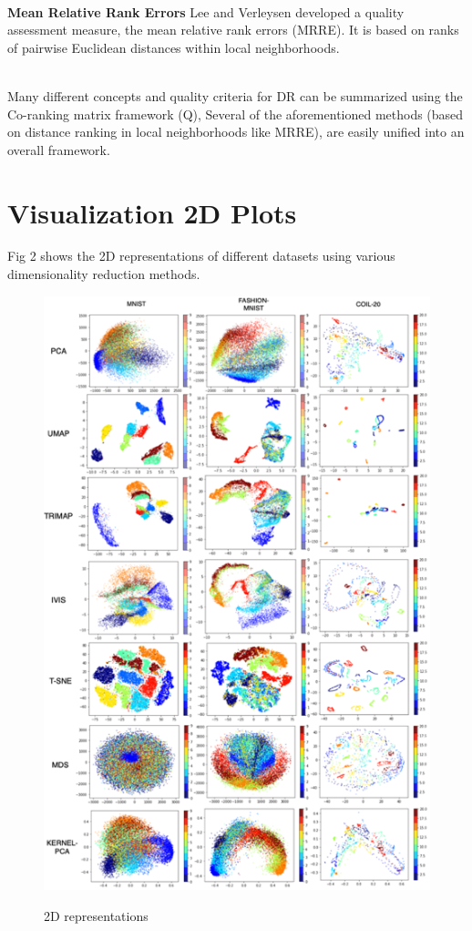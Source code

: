 \documentclass[letterpaper, 10 pt, conference]{ieeeconf}  %
\begin{document}
\\\textbf{Mean Relative Rank Errors} Lee and Verleysen developed a quality assessment measure, the mean relative rank errors (MRRE). It is based on ranks of pairwise Euclidean distances within local neighborhoods.
\vspace{2mm}

\\Many different concepts and quality criteria for DR can be summarized using the Co-ranking matrix framework (Q), Several of the aforementioned methods (based on distance ranking in local neighborhoods like MRRE), are easily unified into an overall framework.

\vspace{4mm}

\section[Visualization]{Visualization 2D Plots}
Fig 2 shows the 2D representations of different datasets using various dimensionality reduction methods.
\begin{figure}[h!]
	\centering
	\includegraphics[width=0.94\linewidth]{screenshot001.png}
	\label{fig:screenshot001}
	\caption{2D representations}
\end{figure}
\end{document}
